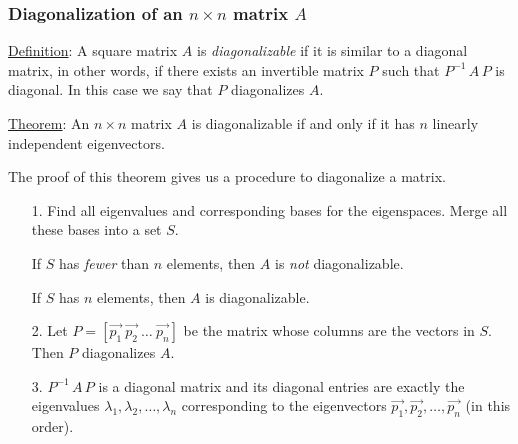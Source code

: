 \documentclass[handout]{beamer}  %
\begin{document}
\begin{frame}
\frametitle{Diagonalization of an $n \times n$ matrix $A$}

\underline{Definition}: A square matrix $A$ is {\em diagonalizable} if it is similar to a diagonal matrix, in other words, if there exists an invertible matrix $P$ such that $P^{-1} \, A \, P$ is diagonal.
In this case we say that $P$ diagonalizes $A$.

\medskip

\underline{Theorem}: An \alert{$n \times n$}  matrix $A$ is diagonalizable if and only if it has \alert{$n$} linearly independent eigenvectors.

\medskip

The proof of this theorem gives us a procedure to diagonalize a matrix.

\begin{itemize}

\item[1.] Find all eigenvalues and corresponding bases for the eigenspaces.
Merge all these bases into a set $S$.

If $S$ has {\em fewer} than $n$ elements, then $A$ is {\em not} diagonalizable.

If $S$ has $n$ elements, then $A$  is diagonalizable.

\item[2.] Let $P = [ \vec{p_1} \ \vec{p_2} \ \ldots \ \vec{p_n} ]$ be the matrix whose columns are the vectors in $S$.
Then $P$ diagonalizes $A$.

\item[3.] $P^{-1} \, A \, P$ is a  diagonal matrix and its diagonal entries are exactly the eigenvalues $\lambda_1, \lambda_2, \ldots, \lambda_n$  corresponding to the eigenvectors  $\vec{p_1}, \vec{p_2}, \ldots, \vec{p_n}$ (in this order).

\end{itemize}

\end{frame}
\end{document}
